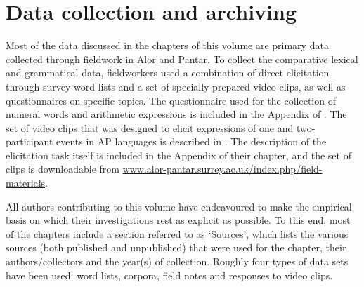 \section{Data collection and archiving}\label{sec:1:8}

Most of the data discussed in the chapters of this volume are primary data collected through fieldwork in Alor and Pantar. To collect the comparative lexical and grammatical data, fieldworkers used a combination of direct elicitation through survey word lists and a set of specially prepared video clips, as well as questionnaires on specific topics. The questionnaire used for the collection of numeral words and arithmetic expressions is included in the Appendix of \citet{KlamerSchapperCorbettTVnumeralwords}. The set of video clips that was designed to elicit expressions of one and two-participant events in AP languages is described in \citet{FeddenEtAlTV}. The description of the elicitation task itself is included in the Appendix of their chapter, and the set of clips is downloadable from \url{www.alor-pantar.surrey.ac.uk/index.php/field-materials}.

All authors contributing to this volume have endeavoured to make the empirical basis on which their investigations rest as explicit as possible. To this end, most of the chapters include a section referred to as `Sources', which lists the various sources (both published and unpublished) that were used for the chapter, their authors/collectors and the year(s) of collection. Roughly four types of data sets have been used: word lists, corpora, field notes and responses to video clips. 

